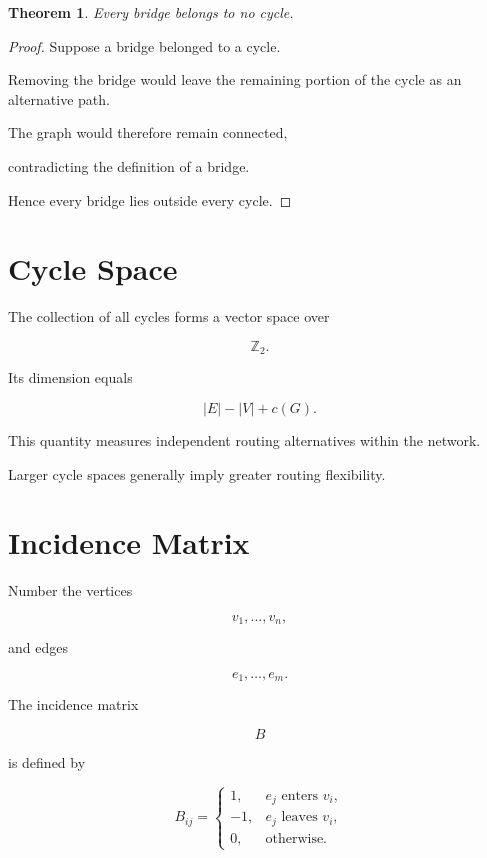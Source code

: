 \documentclass[11pt,fleqn]{book}
\numberwithin{equation}{chapter}
\theoremstyle{plain}
\newtheorem{theorem}{Theorem}[chapter]
\theoremstyle{definition}
\theoremstyle{remark}
\begin{document}
\begin{theorem}

Every bridge belongs to no cycle.

\end{theorem}

\begin{proof}

Suppose a bridge belonged to a cycle.

Removing the bridge would leave the remaining portion of the cycle as an
alternative path.

The graph would therefore remain connected,

contradicting the definition of a bridge.

Hence every bridge lies outside every cycle.

\end{proof}


\section{Cycle Space}

The collection of all cycles forms a vector space over

\[
\mathbb Z_2.
\]

Its dimension equals

\[
\boxed{
|E|-|V|+c(G).
}
\]

This quantity measures independent routing alternatives within the
network.

Larger cycle spaces generally imply greater routing flexibility.


\section{Incidence Matrix}

Number the vertices

\[
v_1,\ldots,v_n,
\]

and edges

\[
e_1,\ldots,e_m.
\]

The incidence matrix

\[
B
\]

is defined by

\[
B_{ij}
=
\begin{cases}
1,&e_j\text{ enters }v_i,\\
-1,&e_j\text{ leaves }v_i,\\
0,&\text{otherwise.}
\end{cases}
\]
\end{document}
